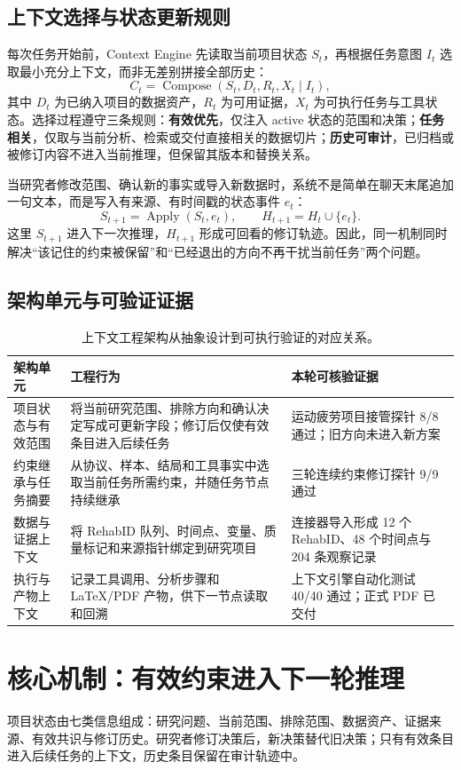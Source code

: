\documentclass[11pt,a4paper]{article}
\begin{document}
\subsection{上下文选择与状态更新规则}
每次任务开始前，Context Engine 先读取当前项目状态 $S_t$，再根据任务意图 $I_t$ 选取最小充分上下文，而非无差别拼接全部历史：
\[
C_t=\operatorname{Compose}(S_t, D_t, R_t, X_t \mid I_t),
\]
其中 $D_t$ 为已纳入项目的数据资产，$R_t$ 为可用证据，$X_t$ 为可执行任务与工具状态。选择过程遵守三条规则：\textbf{有效优先}，仅注入 active 状态的范围和决策；\textbf{任务相关}，仅取与当前分析、检索或交付直接相关的数据切片；\textbf{历史可审计}，已归档或被修订内容不进入当前推理，但保留其版本和替换关系。

当研究者修改范围、确认新的事实或导入新数据时，系统不是简单在聊天末尾追加一句文本，而是写入有来源、有时间戳的状态事件 $e_t$：
\[
S_{t+1}=\operatorname{Apply}(S_t,e_t),\qquad H_{t+1}=H_t\cup\{e_t\}.
\]
这里 $S_{t+1}$ 进入下一次推理，$H_{t+1}$ 形成可回看的修订轨迹。因此，同一机制同时解决“该记住的约束被保留”和“已经退出的方向不再干扰当前任务”两个问题。

\subsection{架构单元与可验证证据}
\begin{table}[H]
\centering
\small
\begin{tabularx}{\linewidth}{@{}p{3.0cm}Yp{3.1cm}@{}}
\toprule
架构单元 & 工程行为 & 本轮可核验证据 \\
\midrule
项目状态与有效范围 & 将当前研究范围、排除方向和确认决定写成可更新字段；修订后仅使有效条目进入后续任务 & 运动疲劳项目接管探针 8/8 通过；旧方向未进入新方案 \\
约束继承与任务摘要 & 从协议、样本、结局和工具事实中选取当前任务所需约束，并随任务节点持续继承 & 三轮连续约束修订探针 9/9 通过 \\
数据与证据上下文 & 将 RehabID 队列、时间点、变量、质量标记和来源指针绑定到研究项目 & 连接器导入形成 12 个 RehabID、48 个时间点与 204 条观察记录 \\
执行与产物上下文 & 记录工具调用、分析步骤和 LaTeX/PDF 产物，供下一节点读取和回溯 & 上下文引擎自动化测试 40/40 通过；正式 PDF 已交付 \\
\bottomrule
\end{tabularx}
\caption{上下文工程架构从抽象设计到可执行验证的对应关系。}
\label{tab:context-engineering-evidence}
\end{table}

\section{核心机制：有效约束进入下一轮推理}
项目状态由七类信息组成：研究问题、当前范围、排除范围、数据资产、证据来源、有效共识与修订历史。研究者修订决策后，新决策替代旧决策；只有有效条目进入后续任务的上下文，历史条目保留在审计轨迹中。
\end{document}
